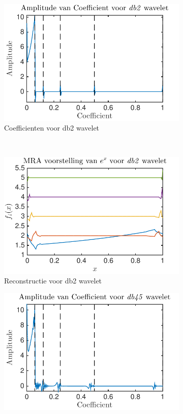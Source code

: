 \begin{figure}
\begin{subfigure}[b]{0.4\textwidth}
        \includegraphics[width=\textwidth]{../src/denoising/db2_noNoise/coef_exp_db2_4}
        \caption{Coefficienten voor db2 wavelet}
    \end{subfigure}
    ~ %
    \begin{subfigure}[b]{0.4\textwidth}
        \includegraphics[width=\textwidth]{../src/denoising/db2_noNoise/MRA_exp_db2_4}
        \caption{Reconstructie voor db2 wavelet}
    \end{subfigure}
    \begin{subfigure}[b]{0.4\textwidth}
        \includegraphics[width=\textwidth]{../src/denoising/db45_noNoise/coef_exp_db45_4}

\end{subfigure}
\end{figure}
